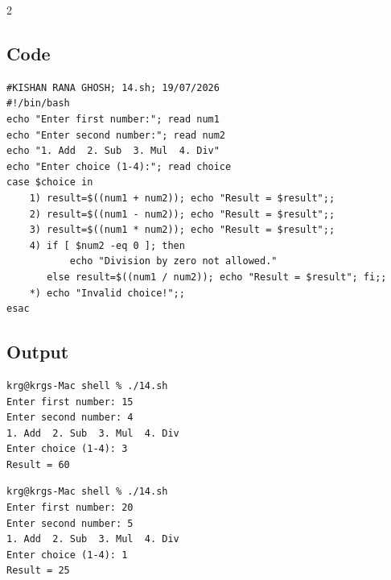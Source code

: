\documentclass[a4paper,12pt]{article}
\begin{document}
\begin{multicols}{2}
\subsection*{Code}
\begin{lstlisting}[style=bashstyle]
#KISHAN RANA GHOSH; 14.sh; 19/07/2026
#!/bin/bash
echo "Enter first number:"; read num1
echo "Enter second number:"; read num2
echo "1. Add  2. Sub  3. Mul  4. Div"
echo "Enter choice (1-4):"; read choice
case $choice in
    1) result=$((num1 + num2)); echo "Result = $result";;
    2) result=$((num1 - num2)); echo "Result = $result";;
    3) result=$((num1 * num2)); echo "Result = $result";;
    4) if [ $num2 -eq 0 ]; then
           echo "Division by zero not allowed."
       else result=$((num1 / num2)); echo "Result = $result"; fi;;
    *) echo "Invalid choice!";;
esac
\end{lstlisting}

\subsection*{Output}
\begin{lstlisting}[style=outputstyle]
krg@krgs-Mac shell % ./14.sh
Enter first number: 15
Enter second number: 4
1. Add  2. Sub  3. Mul  4. Div
Enter choice (1-4): 3
Result = 60
\end{lstlisting}
\begin{lstlisting}[style=outputstyle]
krg@krgs-Mac shell % ./14.sh
Enter first number: 20
Enter second number: 5
1. Add  2. Sub  3. Mul  4. Div
Enter choice (1-4): 1
Result = 25
\end{lstlisting}

\end{multicols}
\newpage
\end{document}
